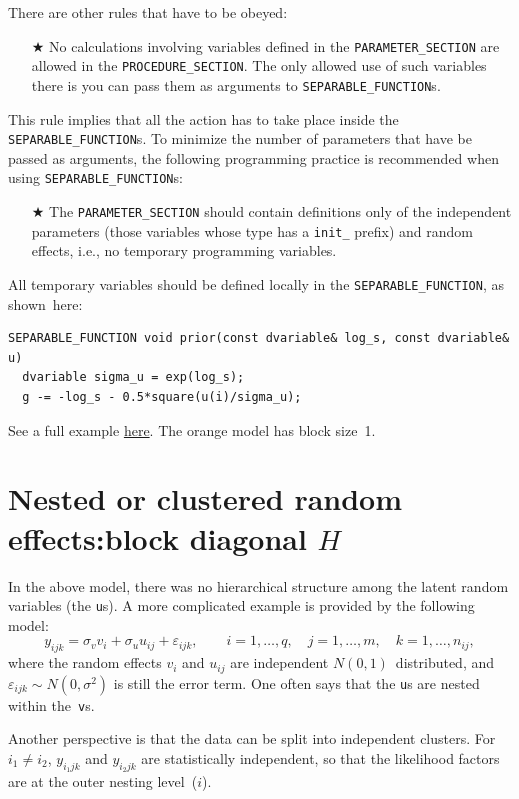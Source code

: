 \documentclass{admbmanual}
\begin{document}
There are other rules that have to be obeyed:
\begin{itemize}
  \item[$\bigstar$] No calculations involving variables defined in the \texttt{PARAMETER\_SECTION} 
		  are allowed in the \texttt{PROCEDURE\_SECTION}. The only allowed use of such variables there 
			is you can pass them as arguments to \texttt{SEPARABLE\_FUNCTION}s.
\end{itemize}
This rule implies that all the action has to take place inside the \texttt{SEPARABLE\_FUNCTION}s.
To minimize the number of parameters that have be passed as arguments, the following programming
practice is recommended when using \texttt{SEPARABLE\_FUNCTION}s:
\begin{itemize}
  \item[$\bigstar$] The \texttt{PARAMETER\_SECTION} should contain definitions only of 
		    the independent parameters (those variables whose type has 
		    a \texttt{init\_} prefix) and random effects, i.e., no temporary 
		    programming variables.
\end{itemize}
All temporary variables should be defined locally in
the \texttt{SEPARABLE\_FUNCTION}, as shown~here:
\begin{lstlisting}	
SEPARABLE_FUNCTION void prior(const dvariable& log_s, const dvariable& u)
  dvariable sigma_u = exp(log_s);
  g -= -log_s - 0.5*square(u(i)/sigma_u);
\end{lstlisting}

See a full example \href{http://otter-rsch.com/admbre/examples/orange/orange.html}{here}.
The orange model has block size~1.


\section{Nested or clustered random effects:\br block diagonal $H$}
\label{sec:nested}

In the above model, there was no hierarchical structure among the 
latent random variables (the \texttt{u}s). A more complicated example
is provided by the following model:
\[
  y_{ijk}= \sigma_v v_{i} + \sigma_u u_{ij}+\varepsilon_{ijk},
            \qquad i=1,\ldots ,q,\quad j=1,\ldots ,m,\quad k=1,\ldots ,n_{ij},
\]
where the random effects $v_{i}$ and $u_{ij}$ are independent $N(0,1)$~distributed,
and $\varepsilon_{ijk}\sim N(0,\sigma^2)$ is still the error term. 
One often says that the \texttt{u}s are nested within the~\texttt{v}s.

Another perspective is that the data can be split into independent clusters.
For $i_1\neq i_2$, $y_{i_1jk}$ and $y_{i_2jk}$ are statistically independent,
so that the likelihood factors are at the outer nesting level~($i$). 
\end{document}

